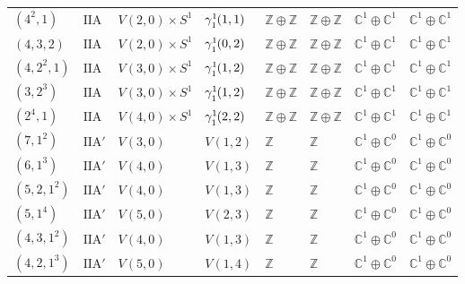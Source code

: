 \documentclass[11pt,a4paper]{article}
\def\unitbundle#1#2#3{{\gamma^1\!\!\!\strut_{#1}(#2,#3)}}
\begin{document}
\begin{appendix}
\begin{table}
\begin{tabular}{C{2.65cm}C{0.85cm}C{3.0cm}C{3.0cm}C{2.25cm}C{2.25cm}C{1.55cm}C{1.55cm}}
\((4^{2}, 1)\) & \(\mathrm{IIA}\) & \(V(2,0) \times S^{1}\) & \(\unitbundle{1}{1}{1}\) & \(\mathbb{Z} \oplus \mathbb{Z}\) & \(\mathbb{Z} \oplus \mathbb{Z}\) & \(\mathbb{C}^{1} \oplus \mathbb{C}^{1}\) & \(\mathbb{C}^{1} \oplus \mathbb{C}^{1}\) \\
\((4, 3, 2)\) & \(\mathrm{IIA}\) & \(V(2,0) \times S^{1}\) & \(\unitbundle{1}{0}{2}\) & \(\mathbb{Z} \oplus \mathbb{Z}\) & \(\mathbb{Z} \oplus \mathbb{Z}\) & \(\mathbb{C}^{1} \oplus \mathbb{C}^{1}\) & \(\mathbb{C}^{1} \oplus \mathbb{C}^{1}\) \\
\((4, 2^{2}, 1)\) & \(\mathrm{IIA}\) & \(V(3,0) \times S^{1}\) & \(\unitbundle{1}{1}{2}\) & \(\mathbb{Z} \oplus \mathbb{Z}\) & \(\mathbb{Z} \oplus \mathbb{Z}\) & \(\mathbb{C}^{1} \oplus \mathbb{C}^{1}\) & \(\mathbb{C}^{1} \oplus \mathbb{C}^{1}\) \\
\((3, 2^{3})\) & \(\mathrm{IIA}\) & \(V(3,0) \times S^{1}\) & \(\unitbundle{1}{1}{2}\) & \(\mathbb{Z} \oplus \mathbb{Z}\) & \(\mathbb{Z} \oplus \mathbb{Z}\) & \(\mathbb{C}^{1} \oplus \mathbb{C}^{1}\) & \(\mathbb{C}^{1} \oplus \mathbb{C}^{1}\) \\
\((2^{4}, 1)\) & \(\mathrm{IIA}\) & \(V(4,0) \times S^{1}\) & \(\unitbundle{1}{2}{2}\) & \(\mathbb{Z} \oplus \mathbb{Z}\) & \(\mathbb{Z} \oplus \mathbb{Z}\) & \(\mathbb{C}^{1} \oplus \mathbb{C}^{1}\) & \(\mathbb{C}^{1} \oplus \mathbb{C}^{1}\) \\
\((7, 1^{2})\) & \(\mathrm{IIA}'\) & \(V(3,0)\) & \(V(1,2)\) & \(\mathbb{Z}\) & \(\mathbb{Z}\) & \(\mathbb{C}^{1} \oplus \mathbb{C}^{0}\) & \(\mathbb{C}^{1} \oplus \mathbb{C}^{0}\) \\
\((6, 1^{3})\) & \(\mathrm{IIA}'\) & \(V(4,0)\) & \(V(1,3)\) & \(\mathbb{Z}\) & \(\mathbb{Z}\) & \(\mathbb{C}^{1} \oplus \mathbb{C}^{0}\) & \(\mathbb{C}^{1} \oplus \mathbb{C}^{0}\) \\
\((5, 2, 1^{2})\) & \(\mathrm{IIA}'\) & \(V(4,0)\) & \(V(1,3)\) & \(\mathbb{Z}\) & \(\mathbb{Z}\) & \(\mathbb{C}^{1} \oplus \mathbb{C}^{0}\) & \(\mathbb{C}^{1} \oplus \mathbb{C}^{0}\) \\
\((5, 1^{4})\) & \(\mathrm{IIA}'\) & \(V(5,0)\) & \(V(2,3)\) & \(\mathbb{Z}\) & \(\mathbb{Z}\) & \(\mathbb{C}^{1} \oplus \mathbb{C}^{0}\) & \(\mathbb{C}^{1} \oplus \mathbb{C}^{0}\) \\
\((4, 3, 1^{2})\) & \(\mathrm{IIA}'\) & \(V(4,0)\) & \(V(1,3)\) & \(\mathbb{Z}\) & \(\mathbb{Z}\) & \(\mathbb{C}^{1} \oplus \mathbb{C}^{0}\) & \(\mathbb{C}^{1} \oplus \mathbb{C}^{0}\) \\
\((4, 2, 1^{3})\) & \(\mathrm{IIA}'\) & \(V(5,0)\) & \(V(1,4)\) & \(\mathbb{Z}\) & \(\mathbb{Z}\) & \(\mathbb{C}^{1} \oplus \mathbb{C}^{0}\) & \(\mathbb{C}^{1} \oplus \mathbb{C}^{0}\) \\

\end{tabular}
\end{table}
\end{appendix}
\end{document}
